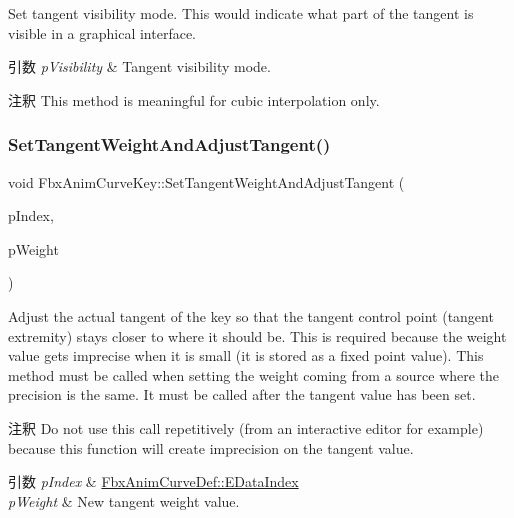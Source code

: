 Set tangent visibility mode. This would indicate what part of the tangent is visible in a graphical interface. 
\begin{DoxyParams}{引数}
{\em p\+Visibility} & Tangent visibility mode. \\
\hline
\end{DoxyParams}
\begin{DoxyRemark}{注釈}
This method is meaningful for cubic interpolation only. 
\end{DoxyRemark}
\mbox{\label{class_fbx_anim_curve_key_a9ea49dd21bb571575005dd678ecba501}} 
\subsubsection{\texorpdfstring{Set\+Tangent\+Weight\+And\+Adjust\+Tangent()}{SetTangentWeightAndAdjustTangent()}}
{\footnotesize\ttfamily void Fbx\+Anim\+Curve\+Key\+::\+Set\+Tangent\+Weight\+And\+Adjust\+Tangent (\begin{DoxyParamCaption}\item[{\hyperlink{class_fbx_anim_curve_def_a3be261d961f8226235529b148cf80300}{Fbx\+Anim\+Curve\+Def\+::\+E\+Data\+Index}}]{p\+Index,  }\item[{double}]{p\+Weight }\end{DoxyParamCaption})}

Adjust the actual tangent of the key so that the tangent control point (tangent extremity) stays closer to where it should be. This is required because the weight value gets imprecise when it is small (it is stored as a fixed point value). This method must be called when setting the weight coming from a source where the precision is the same. It must be called after the tangent value has been set. \begin{DoxyRemark}{注釈}
Do not use this call repetitively (from an interactive editor for example) because this function will create imprecision on the tangent value. 
\end{DoxyRemark}

\begin{DoxyParams}{引数}
{\em p\+Index} & \hyperlink{class_fbx_anim_curve_def_a3be261d961f8226235529b148cf80300}{Fbx\+Anim\+Curve\+Def\+::\+E\+Data\+Index} \\
\hline
{\em p\+Weight} & New tangent weight value. \\
\hline
\end{DoxyParams}
\mbox{\label{class_fbx_anim_curve_key_a418159da0643ccdbeb5aa59b69b821e0}} 

